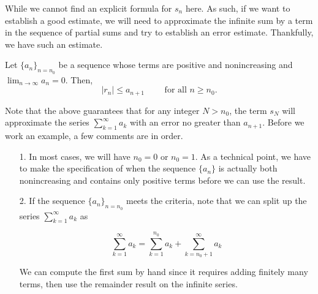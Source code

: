 \documentclass{ximera}
\begin{document}
While we cannot find an explicit formula for $s_n$ here.  As such, if we want to establish a good estimate, we will need to approximate the infinite sum by a term in the sequence of partial sums and try to establish an error estimate.  Thankfully, we have such an estimate.



\begin{theorem}
Let $\{a_n\}_{n=n_0}$ be a sequence whose terms are positive and nonincreasing  and
$\lim_{n\to\infty}a_n=0$. Then,  
\[
\big| r_n \big| \leq a_{n+1} \qquad \textrm{ for all } n \geq n_0.
\]
\end{theorem}

Note that the above guarantees that for any integer $N>n_0$, the term $s_N$ will approximate the series $\sum_{k=1}^{\infty} a_k$ with an error no greater than $a_{n+1}$.  Before we work an example, a few comments are in order.

\begin{itemize}
\item[1.] In most cases, we will have $n_0 = 0$ or $n_0 =1$.  As a technical point, we have to make the specification of when the sequence $\{a_n\}$ is actually both nonincreasing and contains only positive terms before we can use the result.  
\item[2.] If the sequence $\{a_n\}_{n = n_0}$ meets the criteria, note that we can split up the series $\sum_{k=1}^{\infty} a_k$ as 

\[ 
\sum_{k=1}^{\infty} a_k = \sum_{k=1}^{n_0} a_k +\sum_{k=n_0+1}^{\infty} a_k 
\]

We can compute the first sum by hand since it requires adding finitely many terms, then use the remainder result on the infinite series.
\end{itemize}
\end{document}
